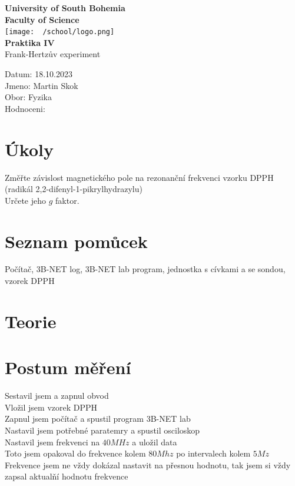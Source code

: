 \documentclass{article}
\begin{document}
\begin{center}
\textbf{\Huge{University of South Bohemia}}\\
\vspace{50px}
\textbf{\Large{Faculty of Science}} \\
\vspace{30px}
\texttt{[image: ~/school/logo.png]} \\
\vspace{30px}
\textbf{\large{Praktika IV}}
\vspace{20px}
\\
\vspace{20px}
\large{Frank-Hertzův experiment} \\
\vspace{60px}
\end{center}
\begin{flushleft}
Datum: 18.10.2023 \\
Jmeno: Martin Skok \\
Obor: Fyzika \\
Hodnoceni:
\end{flushleft}
\newpage
\section{Úkoly}
Změřte závislost magnetického pole na rezonanční frekvenci vzorku DPPH (radikál 2,2-difenyl-1-pikrylhydrazylu) \\
Určete jeho $g$ faktor.
\section{Seznam pomůcek}
Počítač, 3B-NET log, 3B-NET lab program, jednostka s cívkami a se sondou, vzorek DPPH
\section{Teorie}
\section{Postum měření}
Sestavil jsem a zapnul obvod\\
Vložil jsem vzorek DPPH\\
Zapnul jsem počítač a spustil program 3B-NET lab\\
Nastavil jsem potřebné paratemry a spustil osciloskop\\
Nastavil jsem frekvenci na $40 MHz$ a uložil data\\
Toto jsem opakoval do frekvence kolem $80 Mhz$ po intervalech kolem $5Mz$\\
Frekvence jsem ne vždy dokázal nastavit na přesnou hodnotu, tak jsem si vždy zapsal aktualňí hodnotu frekvence\\
\end{document}
